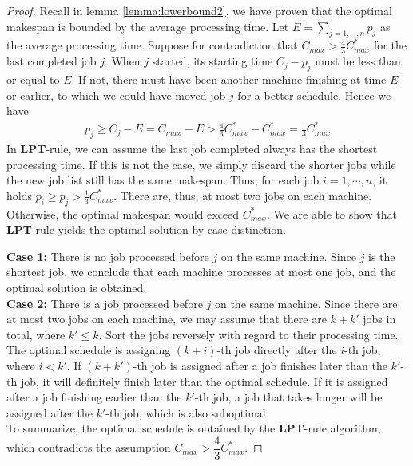 \documentclass[11pt,psfig,times]{article}
\begin{document}
\begin{proof}
    Recall in lemma \cref{lemma:lowerbound2}, we have proven that the optimal makespan is bounded by the average processing time.
    Let $E =  \sum_{j=1, \cdots, n} p_j$ as the average processing time.
    Suppose for contradiction that $C_{max} > \frac{4}{3} C_{max}^*$ for the last completed job $j$. 
    When $j$ started, its starting time $C_j - p_j$ must be less than or equal to
 $E$. If not, there must have been another machine finishing at time $E$ or earlier, to which we could have moved job $j$
    for a better schedule. Hence we have 
    \begin{align*}
        p_j \geq C_j - E = C_{max} - E > \frac{4}{3}C_{max}^* - C_{max}^* = \frac{1}{3} C_{max}^*
    \end{align*}
    In \textbf{LPT}-rule, we can assume the last job completed always has the shortest processing time.
    If this is not the case, we simply discard the shorter jobs while the new job list still has the same makespan. 
    Thus, for each job $i = 1, \cdots, n$, it holds $p_i \geq p_j > \frac{1}{3}C_{max}^*$. 
    There are, thus, at most two jobs on each machine. Otherwise, the optimal makespan would exceed $C_{max}^*$. 
    We are able to show that \textbf{LPT}-rule yields the optimal solution by case distinction. 
    
    \textbf{Case 1:} There is no job processed before $j$ on the same machine. Since $j$ is the shortest job, 
    we conclude that each machine processes at most one job, and the optimal solution is obtained.\\
    \textbf{Case 2:} There is a job processed before $j$ on the same machine. Since there are at most two jobs on each 
    machine, we may assume that there are $k + k'$ jobs in total, where $k' \leq k$. 
    Sort the jobs reversely with regard to their processing time. The optimal schedule is assigning $(k + i)$-th job 
    directly after the $i$-th job, where $i < k'$. If $(k+k')$-th job is assigned after a job finishes later than the $k'$-th job, it will 
    definitely finish later than the optimal schedule. If it is assigned after a job finishing earlier than the $k'$-th job, 
    a job that takes longer will be assigned after the $k'$-th job, which is also suboptimal.\\
    To summarize, the optimal schedule is obtained by the \textbf{LPT}-rule algorithm, which contradicts the assumption $C_{max} > \dfrac{4}{3} C_{max}^*$.
\end{proof}
\end{document}
